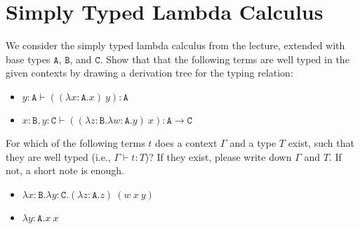\section{Simply Typed Lambda Calculus}
We consider the simply typed lambda calculus from the lecture, extended with base types $\mathtt{A}$, $\mathtt{B}$, and $\mathtt{C}$.
Show that that the following terms are well typed in the given contexts by drawing a derivation tree for the typing relation:

\begin{itemize}
  \item $y:\mathtt{A} \vdash ((\lambda{x:\mathtt{A}}.x)\ y) : \mathtt{A}$
  \item $x:\mathtt{B}, y:\mathtt{C} \vdash ((\lambda{z:\mathtt{B}}.\lambda{w:\mathtt{A}}.y)\ x) : \mathtt{A} \to \mathtt{C}$
\end{itemize}
For which of the following terms $t$ does a context $\Gamma$ and a type $T$ exist,
such that they are well typed (i.e., $\Gamma\vdash t : T$)?
If they exist, please write down \(\Gamma\) and \(T\). If not, a short note is enough.
\begin{itemize}
  \item $\lambda{x:\mathtt{B}}.\lambda{y:\mathtt{C}}.(\lambda{z:\mathtt{A}.z})~(w~x~y)$
  \item $\lambda{y:\mathtt{A}}.x~x$
\end{itemize}

